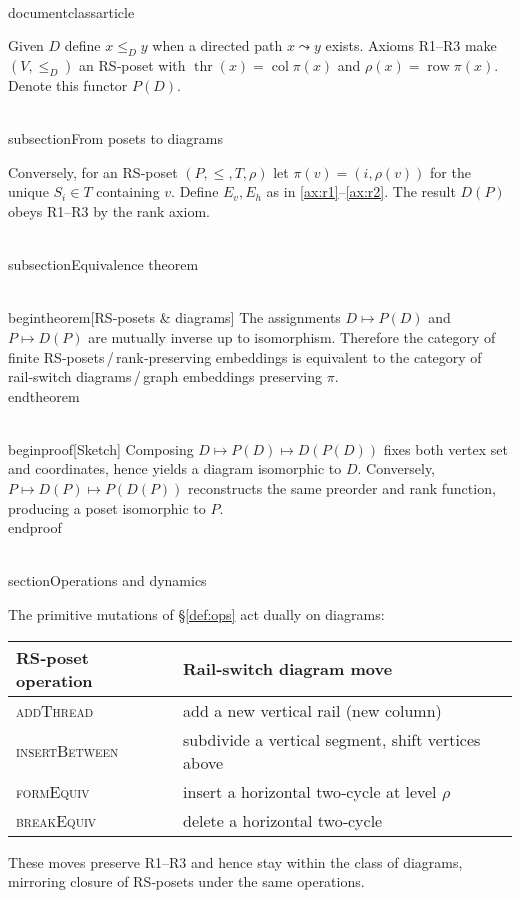 \\documentclass{article}
\begin{document}
Given $D$ define $x\le_D y$ when a directed path $x\leadsto y$ exists.
Axioms R1--R3 make $(V,\le_D)$ an RS‑poset with
$\operatorname{thr}(x)=\operatorname{col}\pi(x)$ and
$\rho(x)=\operatorname{row}\pi(x)$.  Denote this functor
$P(D)$.

\\subsection{From posets to diagrams}

Conversely, for an RS‑poset $(P,\le,T,\rho)$ let $\pi(v)=(i,\rho(v))$
for the unique $S_i\in T$ containing $v$.  Define $E_v,E_h$ as in
\ref{ax:r1}--\ref{ax:r2}.  The result $D(P)$ obeys R1--R3 by the rank
axiom.

\\subsection{Equivalence theorem}

\\begin{theorem}[RS‑posets \& diagrams]\label{thm:equiv}
The assignments $D\mapsto P(D)$ and $P\mapsto D(P)$ are mutually
inverse up to isomorphism.  Therefore the category of finite
RS‑posets\,/\,rank‑preserving embeddings is equivalent to the category
of rail‑switch diagrams\,/\,graph embeddings preserving $\pi$.
\\end{theorem}

\\begin{proof}[Sketch]
Composing $D\mapsto P(D)\mapsto D(P(D))$ fixes both vertex set and
coordinates, hence yields a diagram isomorphic to $D$.  Conversely,
$P\mapsto D(P)\mapsto P(D(P))$ reconstructs the same preorder and rank
function, producing a poset isomorphic to $P$.
\\end{proof}

\\section{Operations and dynamics}

The primitive mutations of \S\ref{def:ops} act dually on diagrams:
\begin{center}
\begin{tabular}{l|l}
RS‑poset operation & Rail‑switch diagram move \\
\hline
\textsc{addThread} & add a new vertical rail (new column) \\
\textsc{insertBetween} & subdivide a vertical segment, shift vertices above \\
\textsc{formEquiv} & insert a horizontal two‑cycle at level $\rho$ \\
\textsc{breakEquiv} & delete a horizontal two‑cycle
\end{tabular}
\end{center}
These moves preserve R1--R3 and hence stay within the class of
diagrams, mirroring closure of RS‑posets under the same operations.
\end{document}
